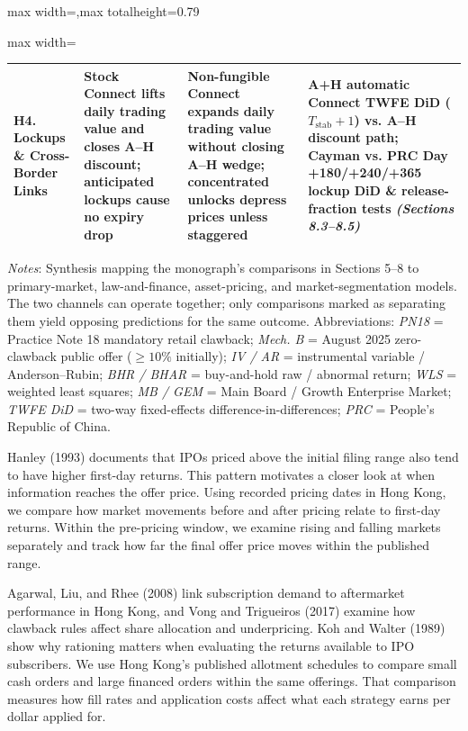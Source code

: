 \documentclass[11pt,letterpaper]{article}
\begin{document}
\begin{table}[!htbp]
\begin{adjustbox}{max width=\textwidth,max totalheight=0.79\textheight}
\begin{minipage}{\textwidth}
\begin{adjustbox}{max width=\textwidth}
\begin{tabular}{>{\raggedright\arraybackslash}p{2.76cm}>{\raggedright\arraybackslash}p{4.35cm}>{\raggedright\arraybackslash}p{4.35cm}>{\raggedright\arraybackslash}p{4.35cm}}
\textbf{H4. Lockups \& Cross-Border Links} & Stock Connect lifts daily trading value and closes A–H discount; anticipated lockups cause no expiry drop & Non-fungible Connect expands daily trading value without closing A–H wedge; concentrated unlocks depress prices unless staggered & A+H automatic Connect TWFE DiD ($T_{\text{stab}}+1$) vs. A–H discount path; Cayman vs. PRC Day +180/+240/+365 lockup DiD \& release-fraction tests \textit{(Sections 8.3–8.5)} \\
\bottomrule
\end{tabular}
\end{adjustbox}
\end{minipage}
\end{adjustbox}
\par\vspace{3pt}\noindent\parbox{\textwidth}{\scriptsize\raggedright \textit{Notes}: Synthesis mapping the monograph's comparisons in Sections 5–8 to primary-market, law-and-finance, asset-pricing, and market-segmentation models. The two channels can operate together; only comparisons marked as separating them yield opposing predictions for the same outcome. Abbreviations: \textit{PN18} = Practice Note 18 mandatory retail clawback; \textit{Mech. B} = August 2025 zero-clawback public offer ($\ge 10\%$ initially); \textit{IV / AR} = instrumental variable / Anderson–Rubin; \textit{BHR / BHAR} = buy-and-hold raw / abnormal return; \textit{WLS} = weighted least squares; \textit{MB / GEM} = Main Board / Growth Enterprise Market; \textit{TWFE DiD} = two-way fixed-effects difference-in-differences; \textit{PRC} = People's Republic of China.}
\end{table}

Hanley (1993) documents that IPOs priced above the initial filing range also tend to have higher first-day returns. This pattern motivates a closer look at when information reaches the offer price. Using recorded pricing dates in Hong Kong, we compare how market movements before and after pricing relate to first-day returns. Within the pre-pricing window, we examine rising and falling markets separately and track how far the final offer price moves within the published range.

Agarwal, Liu, and Rhee (2008) link subscription demand to aftermarket performance in Hong Kong, and Vong and Trigueiros (2017) examine how clawback rules affect share allocation and underpricing. Koh and Walter (1989) show why rationing matters when evaluating the returns available to IPO subscribers. We use Hong Kong’s published allotment schedules to compare small cash orders and large financed orders within the same offerings. That comparison measures how fill rates and application costs affect what each strategy earns per dollar applied for.
\end{document}
